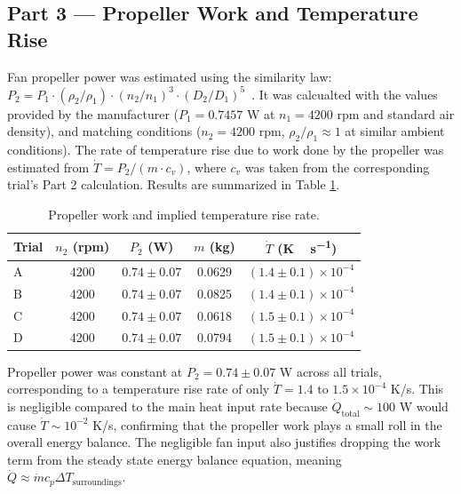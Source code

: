 \documentclass[12pt]{article}
\begin{document}
\subsection*{Part 3 — Propeller Work and Temperature Rise}

Fan propeller power was estimated using the similarity law: $P_2 = P_1 \cdot (\rho_2/\rho_1) \cdot (n_2/n_1)^3 \cdot (D_2/D_1)^5$~\cite{che260_manual}. It was calcualted with the values provided by the manufacturer ($P_1 = 0.7457$ W at $n_1 = 4200$ rpm and standard air density), and matching conditions ($n_2 = 4200$ rpm, $\rho_2/\rho_1 \approx 1$ at similar ambient conditions).
The rate of temperature rise due to work done by the propeller was estimated from $\dot{T} = P_2 / (m \cdot c_v)$, where $c_v$ was taken from the corresponding trial's Part 2 calculation. Results are summarized in Table \ref{tab:prop}.

\begin{table}[H]\centering
\begin{tabular}{@{}lcccc@{}}
\toprule
Trial & $n_2$ (rpm) & $P_2$ (W) & $m$ (kg) & $\dot T$ (\si{K\,s^{-1}}) \\
\midrule
A & 4200 & $0.74 \pm 0.07$ & 0.0629 & $(1.4 \pm 0.1) \times 10^{-4}$ \\
B & 4200 & $0.74 \pm 0.07$ & 0.0825 & $(1.4 \pm 0.1) \times 10^{-4}$ \\
C & 4200 & $0.74 \pm 0.07$ & 0.0618 & $(1.5 \pm 0.1) \times 10^{-4}$ \\
D & 4200 & $0.74 \pm 0.07$ & 0.0794 & $(1.5 \pm 0.1) \times 10^{-4}$ \\
\bottomrule
\end{tabular}
\caption{Propeller work and implied temperature rise rate.}
\label{tab:prop}
\end{table}

Propeller power was constant at $P_2 = 0.74 \pm 0.07$ W across all trials, corresponding to a temperature rise rate of only $\dot{T} = 1.4 \text{ to } 1.5 \times 10^{-4}$ K/s. 
This is negligible compared to the main heat input rate because $\dot{Q}_{\text{total}} \sim 100$ W would cause $\dot{T} \sim 10^{-2}$ K/s, confirming that the propeller work plays a small roll in the overall energy balance. The negligible fan input also justifies dropping the work term from the steady state energy balance equation, meaning $\dot{Q} \approx \dot{m} c_p \Delta T_{\text{surroundings}}$. 
\end{document}
